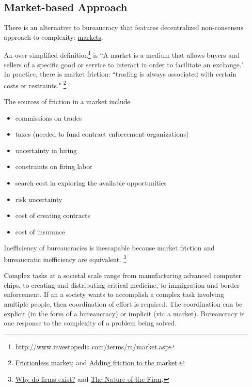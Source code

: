 \subsection{Market-based Approach}

There is an alternative to bureaucracy that features decentralized non-consensus approach to complexity: \href{https://en.wikipedia.org/wiki/Market_(economics)}{markets}.

An over-simplified definition\footnote{\href{http://www.investopedia.com/terms/m/market.asp}{http://www.investopedia.com/terms/m/market.asp}} is ``A market is a medium that allows buyers and sellers of a specific good or service to interact in order to facilitate an exchange." 
In practice, there is market friction: ``trading is always associated with certain costs or restraints."
\footnote{\href{http://www.investopedia.com/terms/f/frictionlessmarket.asp}{Frictionless market};
and \href{https://insight.kellogg.northwestern.edu/article/adding_friction_to_the_market}{Adding friction to the market}.}

The sources of friction in a market include
\begin{itemize}
    \item commissions on trades
    \item taxes (needed to fund contract enforcement organizations)
    \item uncertainty in hiring
    \item constraints on firing labor
    \item search cost in exploring the available opportunities
    \item risk uncertainty
    \item cost of creating contracts
    \item cost of insurance
\end{itemize}
Inefficiency of bureaucracies is inescapable because market friction and bureaucratic inefficiency are equivalent. \footnote{  \href{http://www.economist.com/node/17730360}{Why do firms exist?} and \href{https://en.wikipedia.org/wiki/The_Nature_of_the_Firm}{The Nature of the Firm}.}

Complex tasks at a societal scale range from manufacturing advanced computer chips, to creating and distributing critical medicine, to immigration and border enforcement. 
If an a society wants to accomplish a complex task involving multiple people, then coordination of effort is required. The coordination can be explicit (in the form of a bureaucracy) or implicit (via a market).  Bureaucracy is one response to the complexity of a problem being solved.


